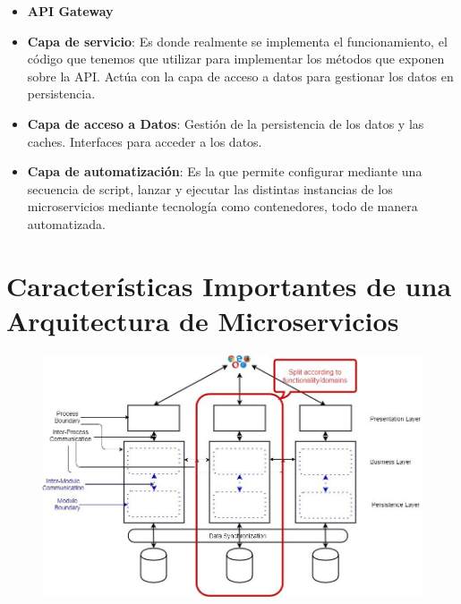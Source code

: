 \documentclass[12pt]{report} %
\begin{document}
\begin{itemize}
\begin{table}[H]
\begin{tabular}{l|c|c|}
		& Necesito conocer la Clase del Objeto & \begin{tabular}[c]{@{}c@{}}No tiene por qué ser conocido \\ el tipo de datos previamente\end{tabular} \\ \hline
		& Si & No \\ \hline
		\end{tabular}
		\caption{Diferencias entre SOAP y ReST}
	\end{table}
	\item \textbf{API Gateway}
	\item \textbf{Capa de servicio}: Es donde realmente se implementa el funcionamiento, el código que tenemos que utilizar para implementar los métodos que exponen sobre la API. Actúa con la capa de acceso a datos para gestionar los datos en persistencia.
	\item \textbf{Capa de acceso a Datos}: Gestión de la persistencia de los datos y las caches. Interfaces para acceder a los datos.
	\item \textbf{Capa de automatización}: Es la que permite configurar mediante una secuencia de script, lanzar y ejecutar las distintas instancias de los microservicios mediante tecnología como contenedores, todo de manera automatizada. 
\end{itemize}

\section{Características Importantes de una Arquitectura de Microservicios}
\begin{figure}[H]
	{\includegraphics[scale=.3]{0_W5T2tfcKgudQZYnu.jpeg}}
\end{figure}
\end{document}
